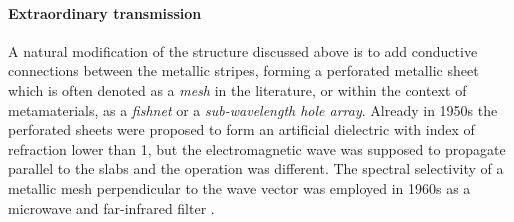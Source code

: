 {\cite{valentine2011development}

\cite{yahiaoui2012metallo} %
%




\cite{yahiaoui2012metallo}
\cite{rockstuhl2008light}
\cite{zhang2005near}
\cite{jelinek2010fishnet}
\cite{marquus2009analytical}
\cite{freire2008experimental}
\cite{jelinek2011metamaterial}


\paragraph{Extraordinary transmission} %
A natural modification of the structure discussed  above is to add conductive connections between the metallic stripes, forming a perforated metallic sheet which is often denoted as a \textit{mesh} in the literature, or within the context of metamaterials, as a \textit{fishnet} or a \textit{sub-wavelength hole array}. Already in 1950s the perforated sheets were proposed to form an artificial dielectric \cite[p. 58]{brown1953artificial} with index of refraction lower than 1, but the electromagnetic wave was supposed to propagate parallel to the slabs and the operation was different.  %
The spectral selectivity of a metallic mesh perpendicular to the wave vector was employed in 1960s as a microwave and far-infrared filter \cite{ulrich1967effective,ulrich1967far, vogel1964transmission}.  %

}
